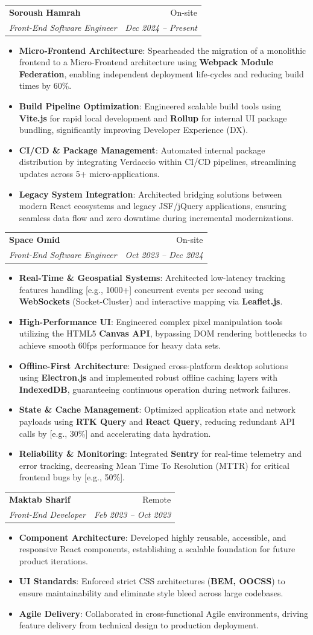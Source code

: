 \documentclass[a4paper, 11pt]{article}
\makeatletter
\newcommand{\resumeItem}[2]{
  \item\small{
    \textbf{#1}{: #2 \vspace{-2pt}}
  }
}
\newcommand{\resumeSubheading}[4]{
  \vspace{-1pt}\item
    \begin{tabular*}{0.97\textwidth}{l@{\extracolsep{\fill}}r}
      \textbf{#1} & #2 \\
      \textit{\small#3} & \textit{\small #4} \\ 
    \end{tabular*}\vspace{-5pt}
}
\newcommand{\resumeItemListStart}{\begin{itemize}}
\newcommand{\resumeItemListEnd}{\end{itemize}\vspace{-5pt}}
\makeatother
\begin{document}
    \resumeSubheading
      {Soroush Hamrah}{On-site}
      {Front-End Software Engineer}{Dec 2024 -- Present}
      \resumeItemListStart
        \resumeItem{Micro-Frontend Architecture}
          {Spearheaded the migration of a monolithic frontend to a Micro-Frontend architecture using \textbf{Webpack Module Federation}, enabling independent deployment life-cycles and reducing build times by 60\%.}
        \resumeItem{Build Pipeline Optimization}
          {Engineered scalable build tools using \textbf{Vite.js} for rapid local development and \textbf{Rollup} for internal UI package bundling, significantly improving Developer Experience (DX).}
        \resumeItem{CI/CD \& Package Management}
          {Automated internal package distribution by integrating Verdaccio within CI/CD pipelines, streamlining updates across 5+ micro-applications.}
        \resumeItem{Legacy System Integration}
          {Architected bridging solutions between modern React ecosystems and legacy JSF/jQuery applications, ensuring seamless data flow and zero downtime during incremental modernizations.}
      \resumeItemListEnd

    \resumeSubheading
      {Space Omid}{On-site}
      {Front-End Software Engineer}{Oct 2023 -- Dec 2024}
      \resumeItemListStart
        \resumeItem{Real-Time \& Geospatial Systems}
          {Architected low-latency tracking features handling [e.g., 1000+] concurrent events per second using \textbf{WebSockets} (Socket-Cluster) and interactive mapping via \textbf{Leaflet.js}.}
        \resumeItem{High-Performance UI}
          {Engineered complex pixel manipulation tools utilizing the HTML5 \textbf{Canvas API}, bypassing DOM rendering bottlenecks to achieve smooth 60fps performance for heavy data sets.}
        \resumeItem{Offline-First Architecture}
          {Designed cross-platform desktop solutions using \textbf{Electron.js} and implemented robust offline caching layers with \textbf{IndexedDB}, guaranteeing continuous operation during network failures.}
        \resumeItem{State \& Cache Management}
          {Optimized application state and network payloads using \textbf{RTK Query} and \textbf{React Query}, reducing redundant API calls by [e.g., 30\%] and accelerating data hydration.}
        \resumeItem{Reliability \& Monitoring}
          {Integrated \textbf{Sentry} for real-time telemetry and error tracking, decreasing Mean Time To Resolution (MTTR) for critical frontend bugs by [e.g., 50\%].}
      \resumeItemListEnd

    \resumeSubheading
      {Maktab Sharif}{Remote}
      {Front-End Developer}{Feb 2023 -- Oct 2023}
      \resumeItemListStart
        \resumeItem{Component Architecture}
          {Developed highly reusable, accessible, and responsive React components, establishing a scalable foundation for future product iterations.}
        \resumeItem{UI Standards}
          {Enforced strict CSS architectures (\textbf{BEM, OOCSS}) to ensure maintainability and eliminate style bleed across large codebases.}
        \resumeItem{Agile Delivery}
          {Collaborated in cross-functional Agile environments, driving feature delivery from technical design to production deployment.}
      \resumeItemListEnd
\end{document}
